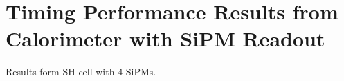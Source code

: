 \section{Timing Performance Results from Calorimeter with SiPM Readout}

Results form SH cell with 4 SiPMs.
